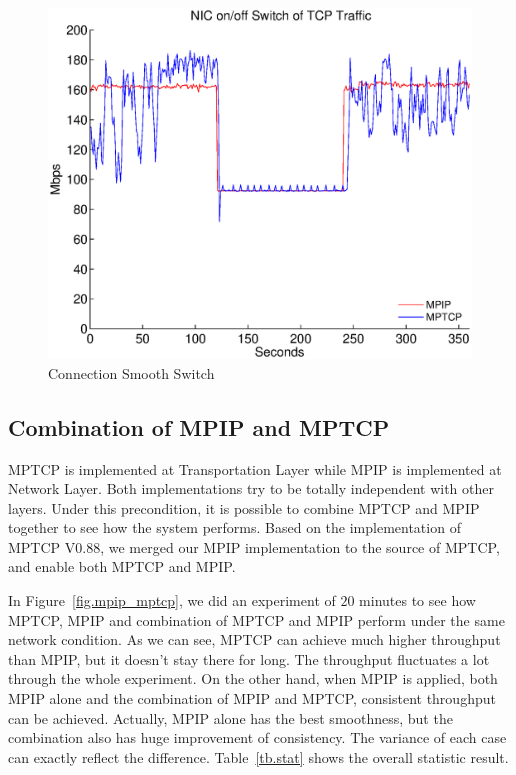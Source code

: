 \begin{figure}
\centering
\includegraphics[width=1\linewidth]{fig/switch.eps}
\caption{Connection Smooth Switch}
\label{fig.switch}
\end{figure}


\subsection{Combination of MPIP and MPTCP}
\label{sec:mpip_mptcp}

MPTCP is implemented at Transportation Layer while MPIP is implemented at Network Layer. Both implementations try to be totally independent with other layers. Under this precondition, it is possible to combine MPTCP and MPIP together to see how the system performs. Based on the implementation of MPTCP V$0.88$, we merged our MPIP implementation to the source of MPTCP, and enable both MPTCP and MPIP.

In Figure~\ref{fig.mpip_mptcp}, we did an experiment of $20$ minutes to see how MPTCP, MPIP and combination of MPTCP and MPIP perform under the same network condition. As we can see, MPTCP can achieve much higher throughput than MPIP, but it doesn't stay there for long. The throughput fluctuates a lot through the whole experiment. On the other hand, when MPIP is applied, both MPIP alone and the combination of MPIP and MPTCP, consistent throughput can be achieved. Actually, MPIP alone has the best smoothness, but the combination also has huge improvement of consistency. The variance of each case can exactly reflect the difference. Table~\ref{tb.stat} shows the overall statistic result.

